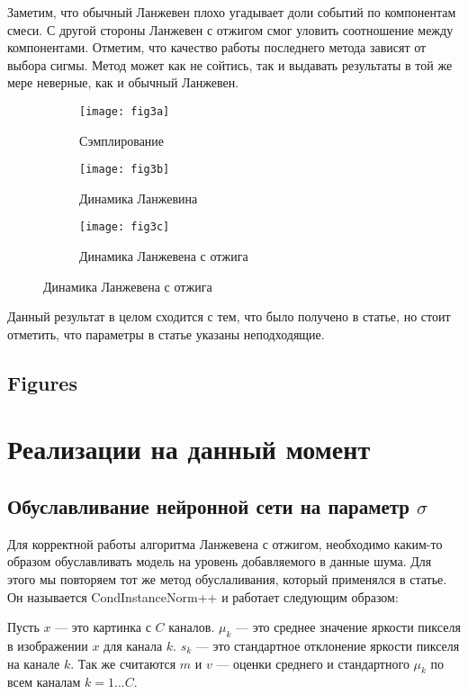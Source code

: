 \documentclass{article}
\begin{document}
Заметим, что обычный Ланжевен плохо угадывает доли событий по компонентам смеси. С другой стороны Ланжевен с отжигом смог уловить соотношение между компонентами. Отметим, что качество работы последнего метода зависят от выбора сигмы. Метод может как не сойтись, так и выдавать результаты в той же мере неверные, как и обычный Ланжевен.


\begin{figure}[H]
	\centering
	\begin{subfigure}[b]{0.4\textwidth}
		\texttt{[image: fig3a]}
		\caption{Сэмплирование}
		\label{fig:3a}
	\end{subfigure}
	\begin{subfigure}[b]{0.4\textwidth}
		\texttt{[image: fig3b]}
		\caption{Динамика Ланжевина}
		\label{fig:3b}
	\end{subfigure}
	\begin{subfigure}[b]{0.4\textwidth}
		\texttt{[image: fig3c]}
		\caption{Динамика Ланжевена с отжига}
		\label{fig:3c}
	\end{subfigure}
\end{figure}

Данный результат в целом сходится с тем, что было получено в статье, но стоит отметить, что параметры в статье указаны неподходящие.

\subsection{Figures}

\section{Реализации на данный момент}

\subsection{Обуславливание нейронной сети на параметр $\sigma$}

Для корректной работы алгоритма Ланжевена с отжигом, необходимо каким-то образом обуславливать модель
на уровень добавляемого в данные шума. Для этого мы повторяем тот же метод обуслаливания, который
применялся в статье. Он называется CondInstanceNorm++ и работает следующим образом:

Пусть $x$ --- это картинка с $C$ каналов. $\mu_k$ --- это среднее значение яркости пикселя в изображении
$x$ для канала $k$. $s_k$ --- это стандартное отклонение яркости пикселя на канале $k$.
Так же считаются $m$ и $v$ --- оценки среднего и стандартного $\mu_k$ по всем каналам $k=1\ldots C$.
\end{document}
